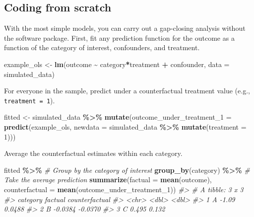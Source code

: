 \documentclass[
]{article}
\newenvironment{Shaded}{\begin{snugshade}}{\end{snugshade}}
\newcommand{\AttributeTok}[1]{\textcolor[rgb]{0.13,0.29,0.53}{#1}}
\newcommand{\CommentTok}[1]{\textcolor[rgb]{0.56,0.35,0.01}{\textit{#1}}}
\newcommand{\DecValTok}[1]{\textcolor[rgb]{0.00,0.00,0.81}{#1}}
\newcommand{\FunctionTok}[1]{\textcolor[rgb]{0.13,0.29,0.53}{\textbf{#1}}}
\newcommand{\NormalTok}[1]{#1}
\newcommand{\OtherTok}[1]{\textcolor[rgb]{0.56,0.35,0.01}{#1}}
\newcommand{\SpecialCharTok}[1]{\textcolor[rgb]{0.81,0.36,0.00}{\textbf{#1}}}
\begin{document}
\subsection{Coding from scratch}\label{coding-from-scratch}

With the most simple models, you can carry out a gap-closing analysis without the software package. First, fit any prediction function for the outcome as a function of the category of interest, confounders, and treatment.

\begin{Shaded}
\begin{Highlighting}[]
\NormalTok{example\_ols }\OtherTok{\textless{}{-}} \FunctionTok{lm}\NormalTok{(outcome }\SpecialCharTok{\textasciitilde{}}\NormalTok{ category}\SpecialCharTok{*}\NormalTok{treatment }\SpecialCharTok{+}\NormalTok{ confounder,}
                  \AttributeTok{data =}\NormalTok{ simulated\_data)}
\end{Highlighting}
\end{Shaded}

For everyone in the sample, predict under a counterfactual treatment value (e.g., \texttt{treatment\ =\ 1}).

\begin{Shaded}
\begin{Highlighting}[]
\NormalTok{fitted }\OtherTok{\textless{}{-}}\NormalTok{ simulated\_data }\SpecialCharTok{\%\textgreater{}\%}
  \FunctionTok{mutate}\NormalTok{(}\AttributeTok{outcome\_under\_treatment\_1 =} \FunctionTok{predict}\NormalTok{(example\_ols,}
                                             \AttributeTok{newdata =}\NormalTok{ simulated\_data }\SpecialCharTok{\%\textgreater{}\%}
                                               \FunctionTok{mutate}\NormalTok{(}\AttributeTok{treatment =} \DecValTok{1}\NormalTok{)))}
\end{Highlighting}
\end{Shaded}

Average the counterfactual estimates within each category.

\begin{Shaded}
\begin{Highlighting}[]
\NormalTok{fitted }\SpecialCharTok{\%\textgreater{}\%}
  \CommentTok{\# Group by the category of interest}
  \FunctionTok{group\_by}\NormalTok{(category) }\SpecialCharTok{\%\textgreater{}\%}
  \CommentTok{\# Take the average prediction}
  \FunctionTok{summarize}\NormalTok{(}\AttributeTok{factual =} \FunctionTok{mean}\NormalTok{(outcome),}
            \AttributeTok{counterfactual =} \FunctionTok{mean}\NormalTok{(outcome\_under\_treatment\_1))}
\CommentTok{\#\textgreater{} \# A tibble: 3 x 3}
\CommentTok{\#\textgreater{}   category factual counterfactual}
\CommentTok{\#\textgreater{}   \textless{}chr\textgreater{}      \textless{}dbl\textgreater{}          \textless{}dbl\textgreater{}}
\CommentTok{\#\textgreater{} 1 A        {-}1.09           0.0488}
\CommentTok{\#\textgreater{} 2 B        {-}0.0384        {-}0.0370}
\CommentTok{\#\textgreater{} 3 C         0.495          0.132}
\end{Highlighting}
\end{Shaded}
\end{document}
